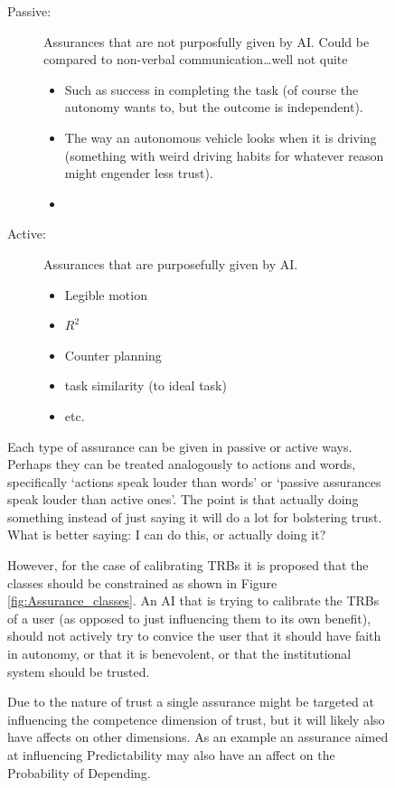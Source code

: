 \begin{figure}[htbp]
    \begin{description}
        \item [Passive:] Assurances that are not purposfully given by AI. Could be compared to non-verbal communication\ldots well not quite
        \begin{itemize}
            \item Such as success in completing the task (of course the autonomy wants to, but the outcome is independent).
            \item The way an autonomous vehicle looks when it is driving (something with weird driving habits for whatever reason might engender less trust). 
            \item 
        \end{itemize}
        \item [Active:] Assurances that are purposefully given by AI.
        \begin{itemize}
            \item Legible motion
            \item $R^2$
            \item Counter planning
            \item task similarity (to ideal task)
            \item etc.
        \end{itemize}
    \end{description}

    Each type of assurance can be given in passive or active ways. Perhaps they can be treated analogously to actions and words, specifically `actions speak louder than words' or `passive assurances speak louder than active ones'. The point is that actually doing something instead of just saying it will do a lot for bolstering trust. What is better saying: I can do this, or actually doing it?

    However, for the case of calibrating TRBs it is proposed that the classes should be constrained as shown in Figure \ref{fig:Assurance_classes}. An AI that is trying to calibrate the TRBs of a user (as opposed to just influencing them to its own benefit), should not actively try to convice the user that it should have faith in autonomy, or that it is benevolent, or that the institutional system should be trusted.

    Due to the nature of trust a single assurance might be targeted at influencing the competence dimension of trust, but it will likely also have affects on other dimensions. As an example an assurance aimed at influencing Predictability may also have an affect on the Probability of Depending.


\end{figure}
